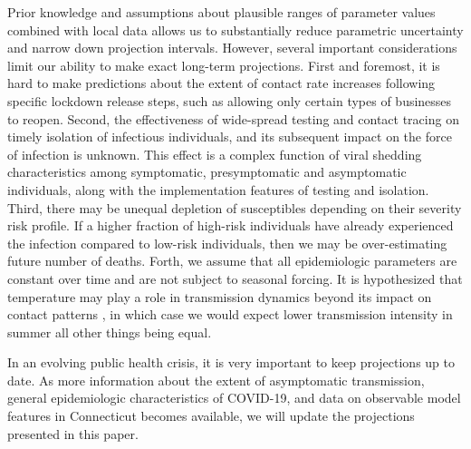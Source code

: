 \documentclass[11pt]{article}
\begin{document}
Prior knowledge and assumptions about plausible ranges of parameter values combined with local data allows us to substantially reduce parametric uncertainty and narrow down projection intervals. However, several important considerations limit our ability to make exact long-term projections. First and foremost, it is hard to make predictions about the extent of contact rate increases following specific lockdown release steps, such as allowing only certain types of businesses to reopen. Second, the effectiveness of wide-spread testing and contact tracing on timely isolation of infectious individuals, and its subsequent impact on the force of infection is unknown. This effect is a complex function of viral shedding characteristics among symptomatic, presymptomatic and asymptomatic individuals, along with the implementation features of testing and isolation. Third, there may be unequal depletion of susceptibles depending on their severity risk profile. If a higher fraction of high-risk individuals have already experienced the infection compared to low-risk individuals, then we may be over-estimating future number of deaths. Forth, we assume that all epidemiologic parameters are constant over time and are not subject to seasonal forcing. It is hypothesized that temperature may play a role in transmission dynamics beyond its impact on contact patterns \citep{kissler2020projecting}, in which case we would expect lower transmission intensity in summer all other things being equal.

In an evolving public health crisis, it is very important to keep projections up to date. As more information about the extent of asymptomatic transmission, general epidemiologic characteristics of COVID-19, and data on observable model features in Connecticut becomes available, we will update the projections presented in this paper.












\end{document}
